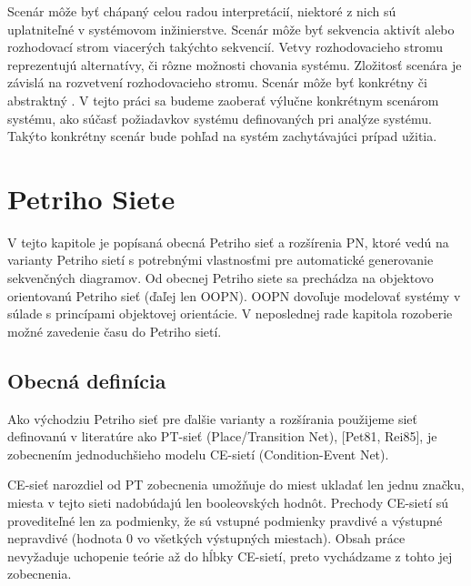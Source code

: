 Scenár môže byť chápaný celou radou interpretácií, niektoré z nich sú uplatniteľné v systémovom inžinierstve. Scenár môže byť sekvencia aktivít alebo rozhodovací strom viacerých takýchto sekvencií. Vetvy rozhodovacieho stromu reprezentujú alternatívy, či rôzne možnosti chovania systému. Zložitosť scenára je závislá na rozvetvení rozhodovacieho stromu. Scenár môže byť konkrétny či abstraktný \cite{scenarios}. V tejto práci sa budeme zaoberať výlučne konkrétnym scenárom systému, ako súčasť požiadavkov systému definovaných pri analýze systému. Takýto konkrétny scenár bude pohľad na systém zachytávajúci prípad užitia.


\chapter{Petriho Siete}
V tejto kapitole je popísaná obecná Petriho sieť a rozšírenia PN, ktoré vedú na varianty Petriho sietí s potrebnými vlastnosťmi pre automatické generovanie sekvenčných diagramov.
Od obecnej Petriho siete sa prechádza na objektovo orientovanú Petriho sieť (ďaľej len OOPN). OOPN dovoľuje modelovať systémy v súlade s princípami objektovej orientácie. V neposlednej rade kapitola rozoberie možné zavedenie času do Petriho sietí.

\section{Obecná definícia}
Ako východziu Petriho sieť pre ďalšie varianty a rozšírania použijeme sieť definovanú v literatúre ako PT-sieť (Place/Transition Net), [Pet81, Rei85], je zobecnením jednoduchšieho modelu CE-sietí (Condition-Event Net).

\begin{note}
	CE-sieť narozdiel od PT zobecnenia umožňuje do miest ukladať len jednu značku, miesta v tejto sieti nadobúdajú len booleovských hodnôt. Prechody CE-sietí sú provediteľné len za podmienky, že sú vstupné podmienky pravdivé a výstupné nepravdivé (hodnota 0 vo všetkých výstupných miestach). Obsah práce nevyžaduje uchopenie teórie až do hĺbky CE-sietí, preto vychádzame z tohto jej zobecnenia. 
\end{note}

